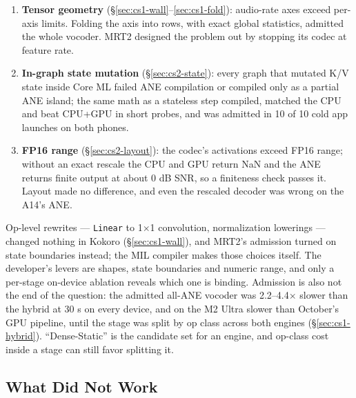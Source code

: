 \documentclass[11pt]{article}
\newcommand{\code}[1]{\texttt{#1}}
\begin{document}
\begin{enumerate}[leftmargin=*]
\item \textbf{Tensor geometry} (\S\ref{sec:cs1-wall}--\ref{sec:cs1-fold}): audio-rate axes exceed per-axis limits. Folding the axis into rows, with exact global statistics, admitted the whole vocoder. MRT2 designed the problem out by stopping its codec at feature rate.
\item \textbf{In-graph state mutation} (\S\ref{sec:cs2-state}): every graph that mutated K/V state inside Core ML failed ANE compilation or compiled only as a partial ANE island; the same math as a stateless step compiled, matched the CPU and beat CPU+GPU in short probes, and was admitted in 10 of 10 cold app launches on both phones.
\item \textbf{FP16 range} (\S\ref{sec:cs2-layout}): the codec's activations exceed FP16 range; without an exact rescale the CPU and GPU return NaN and the ANE returns finite output at about 0 dB SNR, so a finiteness check passes it. Layout made no difference, and even the rescaled decoder was wrong on the A14's ANE.
\end{enumerate}

Op-level rewrites --- \code{Linear} to 1$\times$1 convolution, normalization lowerings --- changed nothing in Kokoro (\S\ref{sec:cs1-wall}), and MRT2's admission turned on state boundaries instead; the MIL compiler makes those choices itself. The developer's levers are shapes, state boundaries and numeric range, and only a per-stage on-device ablation reveals which one is binding. Admission is also not the end of the question: the admitted all-ANE vocoder was 2.2--4.4$\times$ slower than the hybrid at 30 s on every device, and on the M2 Ultra slower than October's GPU pipeline, until the stage was split by op class across both engines (\S\ref{sec:cs1-hybrid}). ``Dense-Static'' is the candidate set for an engine, and op-class cost inside a stage can still favor splitting it.

\subsection{What Did Not Work}\label{sec:disc-negative}
\end{document}
